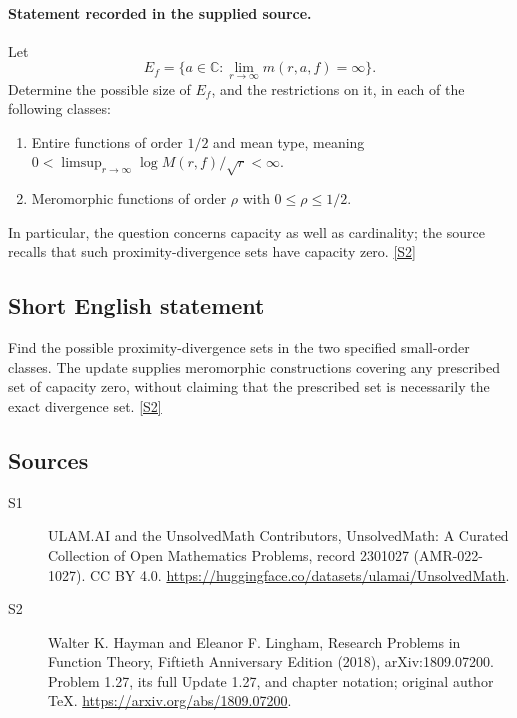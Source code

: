 \documentclass[11pt]{article}
\newcommand{\sref}[2]{\hyperlink{source:#1:#2}{[S#2]}}
\begin{document}
\paragraph{Statement recorded in the supplied source.}
Let
\[
 E_f=\{a\in\mathbb C:\lim_{r\to\infty}m(r,a,f)=\infty\}.
\]
Determine the possible size of $E_f$, and the restrictions on it, in each of the following classes:
\begin{enumerate}
\item Entire functions of order $1/2$ and mean type, meaning $0<\limsup_{r\to\infty}\log M(r,f)/\sqrt r<\infty$.
\item Meromorphic functions of order $\rho$ with $0\le\rho\le1/2$.
\end{enumerate}
In particular, the question concerns capacity as well as cardinality; the source recalls that such proximity-divergence sets have capacity zero. \sref{2301027}{2}
\subsection{Short English statement}
Find the possible proximity-divergence sets in the two specified small-order classes. The update supplies meromorphic constructions covering any prescribed set of capacity zero, without claiming that the prescribed set is necessarily the exact divergence set. \sref{2301027}{2}
\subsection{Sources}
\begin{description}
\item[\hypertarget{source:2301027:1}{S1}] ULAM.AI and the UnsolvedMath Contributors, UnsolvedMath: A Curated Collection of Open Mathematics Problems, record 2301027 (AMR-022-1027). CC BY 4.0. \url{https://huggingface.co/datasets/ulamai/UnsolvedMath}.
\item[\hypertarget{source:2301027:2}{S2}] Walter K. Hayman and Eleanor F. Lingham, Research Problems in Function Theory, Fiftieth Anniversary Edition (2018), arXiv:1809.07200. Problem 1.27, its full Update 1.27, and chapter notation; original author TeX. \url{https://arxiv.org/abs/1809.07200}.
\end{description}
\label{end:2301027}
\end{document}
